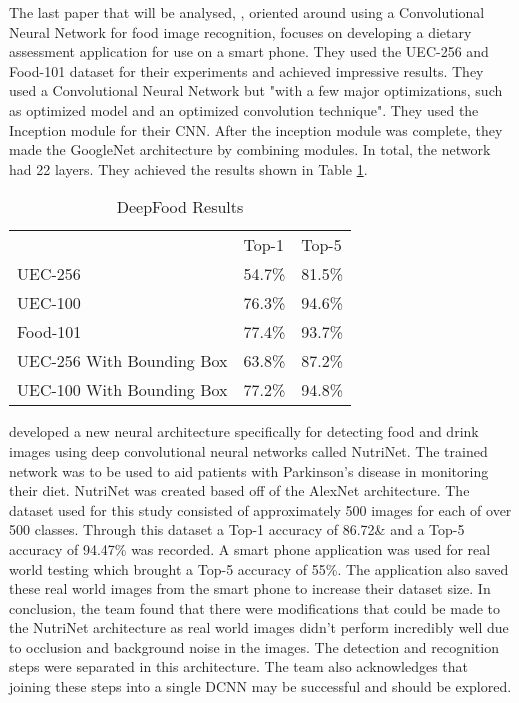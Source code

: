 The last paper that will be analysed, \parencite{deepFood}, oriented around using a Convolutional Neural
Network for food image recognition, focuses on developing a dietary assessment
application for use on a smart phone. They used the UEC-256 and Food-101 dataset
for their experiments and achieved impressive results.
They used a Convolutional Neural Network but "with a few major optimizations,
such as optimized model and an optimized convolution technique". 
They used the Inception module for their CNN. After the
inception module was complete, they made the GoogleNet architecture by combining modules. In
total, the network had 22 layers.
They achieved the results shown in Table \ref{resultsDeepFood}.

\begin{table}[h]
	\centering
	\caption{DeepFood Results}
	\label{resultsDeepFood}
	\begin{tabular}{lll}
		& Top-1  & Top-5  \\
		UEC-256                   & 54.7\% & 81.5\% \\
		UEC-100                   & 76.3\% & 94.6\% \\
		Food-101                  & 77.4\% & 93.7\% \\
		UEC-256 With Bounding Box & 63.8\% & 87.2\% \\
		  UEC-100 With Bounding Box & 77.2\% & 94.8\%
	\end{tabular}
\end{table}

\parencite{nutrinet} developed a new neural architecture specifically for detecting food and drink images using deep convolutional neural networks called NutriNet.
The trained network was to be used to aid patients with Parkinson's disease in monitoring their diet.
NutriNet was created based off of the AlexNet architecture.
The dataset used for this study consisted of approximately 500 images for each of over 500 classes.
Through this dataset a Top-1 accuracy of 86.72\& and a Top-5 accuracy of 94.47\% was recorded.
A smart phone application was used for real world testing which brought a Top-5 accuracy of 55\%.
The application also saved these real world images from the smart phone to increase their dataset size.
In conclusion, the team found that there were modifications that could be made to the NutriNet architecture as real world images didn't perform incredibly well due to occlusion and background noise in the images.
The detection and recognition steps were separated in this architecture.
The team also acknowledges that joining these steps into a single DCNN may be successful and should be explored.

